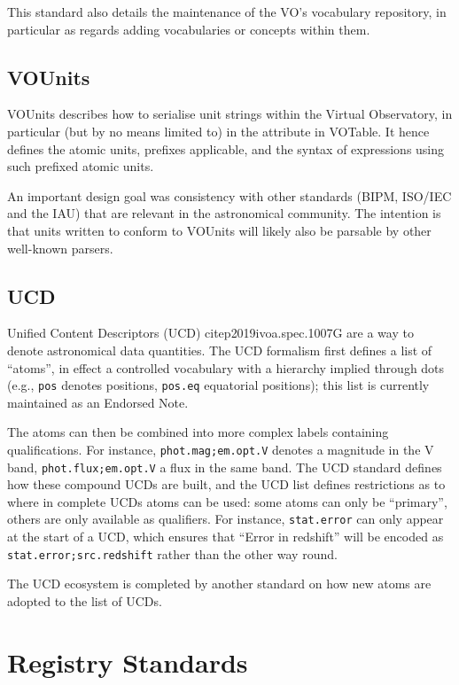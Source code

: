 \documentclass[11pt,a4paper]{ivoa}
\newcommand{\ucd}[1]{\texttt{#1}}
\begin{document}
This standard also details the maintenance of the VO's vocabulary
repository, in particular as regards adding vocabularies or concepts
within them.

\subsection{VOUnits}

VOUnits \citep{2014ivoa.spec.0523D} describes how to serialise unit strings within the Virtual
Observatory, in particular (but by no means limited to) in the
 attribute in VOTable.  It hence defines the atomic units,
prefixes applicable, and the syntax of expressions using such prefixed
atomic units. 

An important design goal was consistency with other standards (BIPM,
ISO/IEC and the IAU) that are relevant in the astronomical community.
The intention is that units written to conform to VOUnits will likely
also be parsable by other well-known parsers.

\subsection{UCD}

Unified Content Descriptors (UCD) citep{2019ivoa.spec.1007G} are a way to denote astronomical data
quantities.  The UCD formalism first defines a list of ``atoms'', in
effect a controlled vocabulary with a hierarchy implied through dots
(e.g., \ucd{pos} denotes positions, \ucd{pos.eq} equatorial positions);
this list is currently maintained as an Endorsed Note.

The atoms can then be combined into more complex labels containing
qualifications.  For instance, \ucd{phot.mag;em.opt.V} denotes a
magnitude in the V band, \ucd{phot.flux;em.opt.V} a flux in the same
band.  The UCD standard defines how these compound UCDs are built, and
the UCD list defines restrictions as to where in complete UCDs atoms can
be used: some atoms can only be ``primary'', others are only available
as qualifiers.  For instance, \ucd{stat.error} can only appear at the
start of a UCD, which ensures that ``Error in redshift'' will be encoded
as \ucd{stat.error;src.redshift} rather than the other way round.

The UCD ecosystem is completed by another standard on how new atoms are
adopted to the list of UCDs.

\section{Registry Standards}
\end{document}
